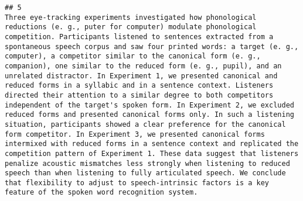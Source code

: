 \documentclass[
  english,
  man]{apa6}
\begin{document}
\begin{verbatim}
## 5                                                                                                                                                                                                                                                                                                                                                                                                                                                                                                                                                                                                                                                                                                                                                                                                                                                                                                                                                                                                                                                                                                                                                                                                                                                                                                                                                                                Three eye-tracking experiments investigated how phonological reductions (e. g., puter for computer) modulate phonological competition. Participants listened to sentences extracted from a spontaneous speech corpus and saw four printed words: a target (e. g., computer), a competitor similar to the canonical form (e. g., companion), one similar to the reduced form (e. g., pupil), and an unrelated distractor. In Experiment 1, we presented canonical and reduced forms in a syllabic and in a sentence context. Listeners directed their attention to a similar degree to both competitors independent of the target's spoken form. In Experiment 2, we excluded reduced forms and presented canonical forms only. In such a listening situation, participants showed a clear preference for the canonical form competitor. In Experiment 3, we presented canonical forms intermixed with reduced forms in a sentence context and replicated the competition pattern of Experiment 1. These data suggest that listeners penalize acoustic mismatches less strongly when listening to reduced speech than when listening to fully articulated speech. We conclude that flexibility to adjust to speech-intrinsic factors is a key feature of the spoken word recognition system.

\end{verbatim}
\end{document}

